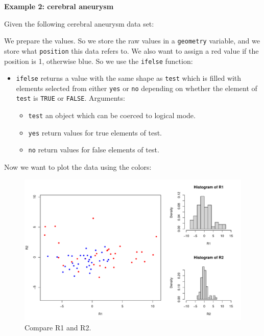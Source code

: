 \documentclass[a4paper]{article}
\newcommand{\example}[1]{\textcolor{Green4}{\textbf{#1}}}
\begin{document}
    \newpage

    \begin{flushleft}
        \example{Example 2: cerebral aneurysm}
    \end{flushleft}
    Given the following cerebral aneurysm data set:
    
    We prepare the values. So we store the raw values in a \texttt{geometry} variable, and we store what \texttt{position} this data refers to. We also want to assign a red value if the position is 1, otherwise blue. So we use the \texttt{ifelse} function:
    \begin{itemize}
        \item \texttt{ifelse} returns a value with the same shape as \texttt{test} which is filled with elements selected from either \texttt{yes} or \texttt{no} depending on whether the element of \texttt{test} is \texttt{TRUE} or \texttt{FALSE}. Arguments:
        \begin{itemize}
            \item \texttt{test} an object which can be coerced to logical mode.
            \item \texttt{yes} return values for true elements of test.
            \item \texttt{no} return values for false elements of test.
        \end{itemize}
    \end{itemize}
    
    Now we want to plot the data using the colors:
    

    \newpage

    \begin{figure}[!htp]
        \centering
        \includegraphics[width=\textwidth]{img/visualization-of-multivariate-data-7.pdf}
        \caption*{Compare R1 and R2.}
    \end{figure}
\end{document}
